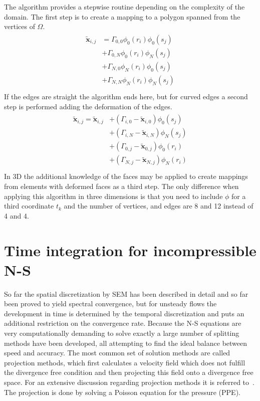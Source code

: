 The algorithm provides a stepwise routine depending on the complexity of the domain. The first step is to create 
a mapping to a polygon spanned from the vertices of $\Omega$.
%
\begin{align}
    \begin{split}
    \mathbf{\tilde{x}}_{i,j} 
             &=\Gamma_{0,0}\phi_0(r_i)\phi_0(s_j)\\
             &+\Gamma_{0,N}\phi_0(r_i)\phi_N(s_j)\\
             &+\Gamma_{N,0}\phi_N(r_i)\phi_0(s_j)\\
             &+\Gamma_{N,N}\phi_N(r_i)\phi_N(s_j)\\
    \end{split}
    \label{eq:gh1}
\end{align}
%
If the edges are straight the algorithm ends here, but for curved edges a second step is performed adding 
the deformation of the edges.
%
\begin{align}
    \begin{split}
        \mathbf{\tilde{x}}_{i,j}  = \mathbf{\tilde{x}}_{i,j} 
             &+(\Gamma_{i,0}-\mathbf{\tilde{x}}_{i,0})\phi_0(s_j)\\
             &+(\Gamma_{i,N}-\mathbf{\tilde{x}}_{i,N})\phi_N(s_j)\\
             &+(\Gamma_{0,j}-\mathbf{\tilde{x}}_{0,j})\phi_0(r_i)\\
             &+(\Gamma_{N,j}-\mathbf{\tilde{x}}_{N,j})\phi_N(r_i)\\
    \end{split}
    \label{eq:gh1}
\end{align}
%
In 3D the additional knowledge of the faces may be applied to create mappings from elements with deformed faces as a 
third step. The only difference when applying this algorithm in three dimensions is that you need to include $\phi$
for a third coordinate $t_k$ and the number of vertices, and edges are 8 and 12 instead of 
4 and 4.



\section{Time integration for incompressible N-S} \label{timeNS}

So far the spatial discretization by SEM has been described in detail and so far been proved to yield spectral convergence,
but for unsteady flows the development in time is determined by the temporal discretization and puts an additional 
restriction on the convergence rate. Because the N-S equations are very computationally demanding to solve exactly 
a large number of splitting methods have been developed, all attempting to find the ideal balance between speed 
and accuracy. The most common set of solution methods are called projection methods, which first calculates 
a velocity field which does not fulfill the divergence free condition and then projecting this field onto a 
divergence free space. For an extensive discussion regarding projection methods it is referred to~\cite{Guermond2006}.
The projection is done by solving a Poisson equation for the pressure (PPE). 

